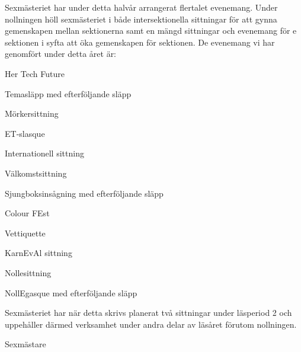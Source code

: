 \documentclass[../_main/handlingar.tex]{subfiles}
\begin{document}
Sexmästeriet har under detta halvår arrangerat flertalet evenemang. Under nollningen höll sexmästeriet i både intersektionella sittningar för att gynna gemenskapen mellan sektionerna samt en mängd sittningar och evenemang för e sektionen i syfta att öka gemenskapen för sektionen. De evenemang vi har genomfört under detta året är:

\begin{dashlist}
    \item Her Tech Future
    \item Temasläpp med efterföljande släpp
    \item Mörkersittning
    \item ET-slasque
    \item Internationell sittning
    \item Välkomstsittning
    \item Sjungboksinsågning med efterföljande släpp
    \item Colour FEst
    \item Vettiquette
    \item KarnEvAl sittning
    \item Nollesittning
    \item NollEgasque med efterföljande släpp
\end{dashlist}

Sexmästeriet har när detta skrivs planerat två sittningar under läsperiod 2 och uppehåller därmed verksamhet under andra delar av läsåret förutom nollningen.
\begin{signatures}{1}
    \mvh
    \signature{Alexander Wik}{Sexmästare}
\end{signatures}
\end{document}

